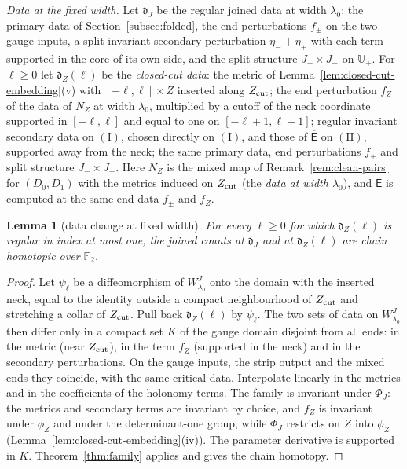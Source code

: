 \documentclass[11pt]{amsart}
\newtheorem{lemma}[theorem]{Lemma}
\theoremstyle{definition}
\theoremstyle{remark}
\theoremstyle{plain}
\numberwithin{equation}{section}
\newcommand{\FF}{\mathbb{F}_2}
\begin{document}
\emph{Data at the fixed width.} Let $\mathfrak d_J$ be the regular joined data at width
$\lambda_0$: the primary data of Section~\ref{subsec:folded}, the end
perturbations $f_\pm$ on the two gauge inputs, a split invariant secondary
perturbation $\eta_-+\eta_+$ with each term supported in the core of its own side, and
the split structure $J_-\times J_+$ on $\mathbb U_+$. For $\ell\ge0$ let $\mathfrak d_Z(\ell)$ be
the \emph{closed-cut data}: the metric of Lemma~\ref{lem:closed-cut-embedding}(v)
with $[-\ell,\ell]\times Z$ inserted along $Z_{\rm cut}$; the end perturbation $f_Z$ of the data of $N_Z$ at width $\lambda_0$, multiplied by a cutoff of the neck coordinate
supported in $[-\ell,\ell]$ and equal to one on $[-\ell+1,\ell-1]$; regular invariant
secondary data on $\mathrm{(I)}$, chosen directly on $\mathrm{(I)}$, and those of
$\overline{\mathsf E}$ on $\mathrm{(II)}$, supported away from the neck; the same primary data, end perturbations $f_\pm$ and split structure
$J_-\times J_+$. Here $N_Z$ is the mixed map of Remark~\ref{rem:clean-pairs} for
$(D_0,D_1)$ with the metrics induced on $Z_{\rm cut}$ (the \emph{data at width $\lambda_0$}), and $\overline{\mathsf E}$ is computed at the same end data $f_\pm$ and
$f_Z$.

\begin{lemma}[data change at fixed width]\label{lem:closed-cut-data}
For every $\ell\ge0$ for which $\mathfrak d_Z(\ell)$ is regular in index at most one, the
joined counts at $\mathfrak d_J$ and at $\mathfrak d_Z(\ell)$ are chain homotopic over
$\FF$.
\end{lemma}

\begin{proof}
Let $\psi_\ell$ be a diffeomorphism of $W^J_{\lambda_0}$ onto the domain with the
inserted neck, equal to the identity outside a compact neighbourhood of
$Z_{\rm cut}$ and stretching a collar of $Z_{\rm cut}$. Pull back $\mathfrak d_Z(\ell)$ by
$\psi_\ell$. The two sets of data on $W^J_{\lambda_0}$ then differ only in a compact set $K$
of the gauge domain disjoint from all ends: in the metric (near $Z_{\rm cut}$), in
the term $f_Z$ (supported in the neck) and in the secondary perturbations. On
the gauge inputs, the strip output and the mixed ends they coincide, with the
same critical data. Interpolate linearly in the metrics and in the coefficients
of the holonomy terms. The family is invariant under $\Phi_J$: the metrics and
secondary terms are invariant by choice, and $f_Z$ is invariant under $\phi_Z$ and
under the determinant-one group, while $\Phi_J$ restricts on $Z$ into $\phi_Z$
(Lemma~\ref{lem:closed-cut-embedding}(iv)). The parameter derivative is supported
in $K$. Theorem~\ref{thm:family} applies and gives the chain homotopy.
\end{proof}
\end{document}
